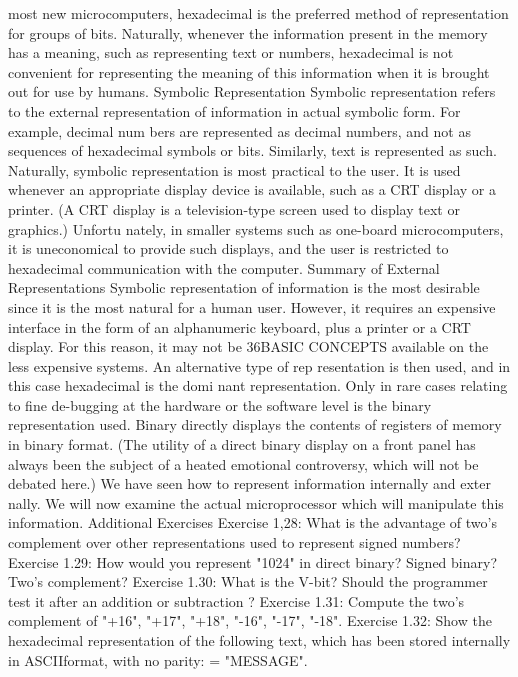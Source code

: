 \documentclass[12pt]{book}
\begin{document}
most new microcomputers, hexadecimal is the preferred method of
representation for groups of bits.
Naturally, whenever the information present in the memory has
a meaning, such as representing text or numbers, hexadecimal is
not convenient for representing the meaning of this information
when it is brought out for use by humans.
Symbolic Representation
Symbolic representation refers to the external representation of
information in actual symbolic form. For example, decimal num
bers are represented as decimal numbers, and not as sequences of
hexadecimal symbols or bits. Similarly, text is represented as
such. Naturally, symbolic representation is most practical to the
user. It is used whenever an appropriate display device is
available, such as a CRT display or a printer. (A CRT display is a
television-type screen used to display text or graphics.) Unfortu
nately, in smaller systems such as one-board microcomputers, it is
uneconomical to provide such displays, and the user is restricted
to hexadecimal communication with the computer.
Summary of External Representations
Symbolic representation of information is the most desirable
since it is the most natural for a human user. However, it requires
an expensive interface in the form of an alphanumeric keyboard,
plus a printer or a CRT display. For this reason, it may not be
36BASIC CONCEPTS
available on the less expensive systems. An alternative type of rep
resentation is then used, and in this case hexadecimal is the domi
nant representation. Only in rare cases relating to fine de-bugging
at the hardware or the software level is the binary representation
used. Binary directly displays the contents of registers of memory
in binary format.
(The utility of a direct binary display on a front panel has always
been the subject of a heated emotional controversy, which will not
be debated here.)
We have seen how to represent information internally and exter
nally. We will now examine the actual microprocessor which will
manipulate this information.
Additional Exercises
Exercise 1,28: What is the advantage of two's complement over other
representations used to represent signed numbers?
Exercise 1.29: How would you represent "1024" in direct binary? Signed
binary? Two's complement?
Exercise 1.30: What is the V-bit? Should the programmer test it after an
addition or subtraction ?
Exercise 1.31: Compute the two's complement of "+16", "+17",
"+18", "-16", "-17", "-18".
Exercise 1.32: Show the hexadecimal representation of the following
text, which has been stored internally in ASCIIformat, with no parity:
= "MESSAGE".
\end{document}
